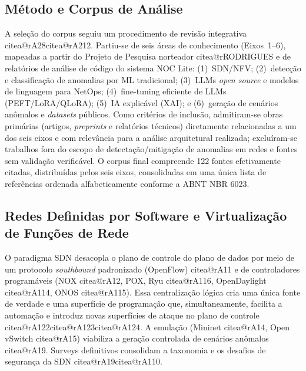 \documentclass[12pt,a4paper]{article}
\makeatletter
\newcommand{\citea}[1]{\begingroup\edef\@currentlabel{\csname citea@#1\endcsname}\@currentlabel\endgroup}
\makeatother
\begin{document}
\subsection{Método e Corpus de Análise}
\label{sec:metodo}

A seleção do corpus seguiu um procedimento de revisão integrativa
\citea{rA28}\citea{rA212}. Partiu-se de seis áreas de conhecimento
(Eixos~1--6), mapeadas a partir do Projeto de Pesquisa norteador
\citea{rRODRIGUES} e de relatórios de análise de código do sistema NOC
Lite: (1)~SDN/NFV; (2)~detecção e classificação de anomalias por ML
tradicional; (3)~LLMs \textit{open source} e modelos de linguagem para
NetOps; (4)~fine-tuning eficiente de LLMs (PEFT/LoRA/QLoRA); (5)~IA
explicável (XAI); e (6)~geração de cenários anômalos e \textit{datasets}
públicos. Como critérios de inclusão, admitiram-se obras primárias
(artigos, \textit{preprints} e relatórios técnicos) diretamente
relacionadas a um dos seis eixos e com relevância para a análise
arquitetural realizada; excluíram-se trabalhos fora do escopo de
detectação/mitigação de anomalias em redes e fontes sem validação
verificável. O corpus final compreende 122 fontes efetivamente citadas,
distribuídas pelos seis eixos, consolidadas em uma única lista de
referências ordenada alfabeticamente conforme a ABNT NBR 6023.

\subsection{Redes Definidas por Software e Virtualização de Funções de Rede}
\label{sec:sdn}

O paradigma SDN desacopla o plano de controle do plano de dados por meio de um
protocolo \textit{southbound} padronizado (OpenFlow) \citea{rA11} e de controladores
programáveis (NOX \citea{rA12}, POX, Ryu \citea{rA116}, OpenDaylight \citea{rA114}, ONOS \citea{rA115}).
Essa centralização lógica cria uma única fonte de verdade e uma superfície de
programação que, simultaneamente, facilita a automação e introduz novas
superfícies de ataque no plano de controle \citea{rA122}\citea{rA123}\citea{rA124}. A emulação
(Mininet \citea{rA14}, Open vSwitch \citea{rA15}) viabiliza a geração controlada de cenários
anômalos \citea{rA19}. Surveys definitivos consolidam a taxonomia e os desafios de
segurança da SDN \citea{rA19}\citea{rA110}.
\end{document}
